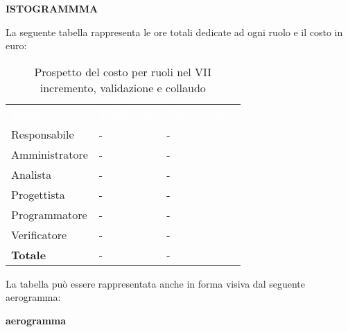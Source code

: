 \textbf{ISTOGRAMMMA}


La seguente tabella rappresenta le ore totali dedicate ad ogni ruolo e il costo in euro:

\begin{table}[!htbp]
\begin{center}
\renewcommand{\arraystretch}{1.5}
\begin{tabular}{ m{}<{\centering}  m{}<{\centering} m{}<{\centering}}
	\rowcolor{darkblue}
	\textcolor{white}{\textbf{Ruolo}}&\textcolor{white}{\textbf{Totale ore}}&\textcolor{white}{\textbf{Costo totale}}\\ 

	Responsabile  & - & - \\	

	Amministratore & - & - \\
	
	Analista & - & - \\
	
	Progettista & - & - \\
	
	Programmatore & - & - \\
	
	Verificatore & - & - \\
	
	\textbf{Totale} & - & - \\
	
\end{tabular}
\caption{Prospetto del costo per ruoli nel VII incremento,  validazione e collaudo}
\end{center}
\end{table}

La tabella può essere rappresentata anche in forma visiva dal seguente aerogramma:

\textbf{aerogramma}


